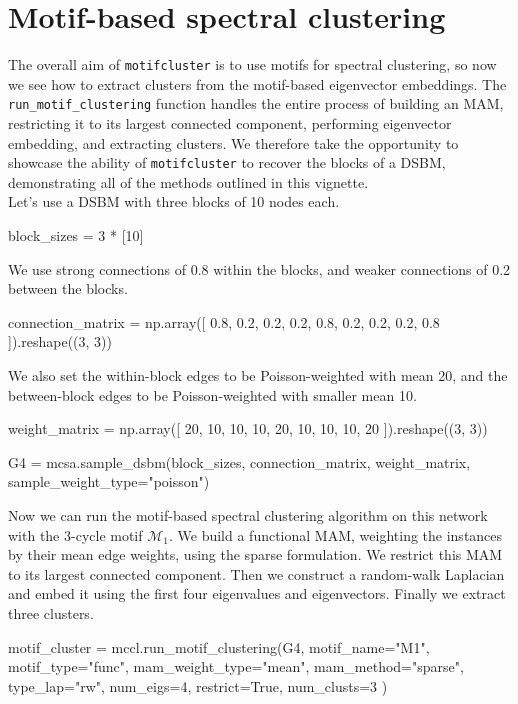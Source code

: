 \documentclass{article}
\begin{document}
\section{Motif-based spectral clustering}

The overall aim of \texttt{motifcluster} is to use motifs for spectral clustering,
so now we see how to extract clusters from the motif-based
eigenvector embeddings.
The \texttt{run\_motif\_clustering} function handles the entire process of
building an MAM, restricting it to its largest connected component,
performing eigenvector embedding, and extracting clusters.
We therefore take the opportunity to showcase the ability of
\texttt{motifcluster} to recover the blocks of a DSBM,
demonstrating all of the methods outlined in this vignette.\\

Let's use a DSBM with three blocks of 10 nodes each.

\begin{pyconsole}
block_sizes = 3 * [10]
\end{pyconsole}

We use strong connections of 0.8 within the blocks,
and weaker connections of 0.2 between the blocks.

\begin{pyconsole}
connection_matrix = np.array([
  0.8, 0.2, 0.2,
  0.2, 0.8, 0.2,
  0.2, 0.2, 0.8
]).reshape((3, 3))
\end{pyconsole}

We also set the within-block edges to be Poisson-weighted with
mean 20,
and the between-block edges to be Poisson-weighted with smaller
mean 10.

\begin{pyconsole}
weight_matrix = np.array([
  20, 10, 10,
  10, 20, 10,
  10, 10, 20
]).reshape((3, 3))

G4 = mcsa.sample_dsbm(block_sizes, connection_matrix, weight_matrix,
  sample_weight_type="poisson")
\end{pyconsole}

Now we can run the motif-based spectral clustering algorithm
on this network with the 3-cycle motif $\mathcal{M}_1$.
We build a functional MAM,
weighting the instances by their mean edge weights,
using the sparse formulation.
We restrict this MAM to its largest connected component.
Then we construct a random-walk Laplacian and embed it using the
first four eigenvalues and eigenvectors.
Finally we extract three clusters.

\begin{pyconsole}
motif_cluster = mccl.run_motif_clustering(G4, motif_name="M1", motif_type="func",
  mam_weight_type="mean", mam_method="sparse", type_lap="rw", num_eigs=4,
  restrict=True, num_clusts=3
)
\end{pyconsole}
\end{document}
